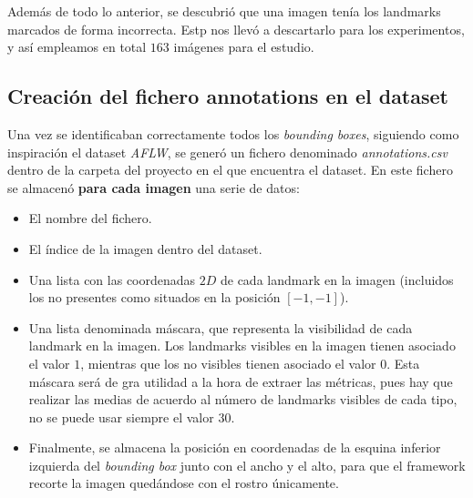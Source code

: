             \medskip

            \noindent Además de todo lo anterior, se descubrió que una imagen tenía los landmarks marcados de forma incorrecta. Estp nos llevó a descartarlo para los experimentos, y así empleamos en total $163$ imágenes para el estudio.

        \subsection{Creación del fichero annotations en el dataset}

            \noindent Una vez se identificaban correctamente todos los \textit{bounding boxes}, siguiendo como inspiración el dataset \textit{AFLW}, se generó un fichero denominado \textit{annotations.csv} dentro de la carpeta del proyecto en el que encuentra el dataset. En este fichero se almacenó \textbf{para cada imagen} una serie de datos: 

            \begin{itemize}
                \item El nombre del fichero.
                \item El índice de la imagen dentro del dataset. 
                \item Una lista con las coordenadas $2D$ de cada landmark en la imagen (incluidos los no presentes como situados en la posición $[-1,-1]$). 
                \item Una lista denominada máscara, que representa la visibilidad de cada landmark en la imagen. Los landmarks visibles en la imagen tienen asociado el valor $1$, mientras que los no visibles tienen asociado el valor $0$. Esta máscara será de gra utilidad a la hora de extraer las métricas, pues hay que realizar las medias de acuerdo al número de landmarks visibles de cada tipo, no se puede usar siempre el valor $30$.
                \item Finalmente, se almacena la posición en coordenadas de la esquina inferior izquierda del \textit{bounding box} junto con el ancho y el alto, para que el framework recorte la imagen quedándose con el rostro únicamente. 
            \end{itemize}

